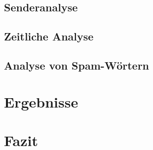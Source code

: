 \documentclass[oneside, 11pt, notitlepage, a4paper, numbers=noenddot]{scrartcl}
\begin{document}
\subsection{Senderanalyse}

\label{Senderanalyse}

\subsection{Zeitliche Analyse}

\label{Zeitliche Analyse}

\subsection{Analyse von Spam-Wörtern}

\label{Analyse von Spam-Wörtern}

\section{Ergebnisse}

\label{Ergebnisse}

\section{Fazit}

\label{Fazit}



\end{document}
